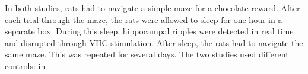 In both studies, rats had to navigate a simple maze for a chocolate reward. After each trial through the maze, the rats were allowed to sleep for one hour in a separate box. During this sleep, hippocampal ripples were detected in real time and disrupted through VHC stimulation. After sleep, the rats had to navigate the same maze. This was repeated for several days. The two studies used different controls: in  






